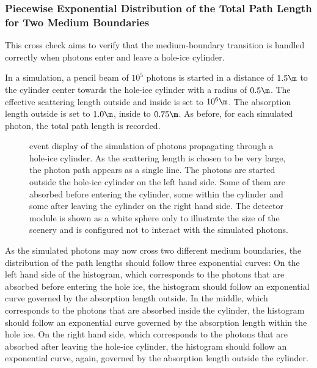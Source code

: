 
\FloatBarrier\newpage
\subsubsection{Piecewise Exponential Distribution of the Total Path Length for Two Medium Boundaries}


This cross check aims to verify that the medium-boundary transition is handled correctly when photons enter and leave a hole-ice cylinder.

In a simulation, a pencil beam of $10^5$ photons is started in a distance of $1.5\m$ to the cylinder center towards the hole-ice cylinder with a radius of $0.5\m$. The effective scattering length outside and inside is set to $10^6\m$. The absorption length outside is set to $1.0\m$, inside to $0.75\m$.
As before, for each simulated photon, the total path length is recorded.


\begin{figure}[htbp]
  \caption{\steamshovel event display of the simulation of photons propagating through a hole-ice cylinder. As the scattering length is chosen to be very large, the photon path appears as a single line.  The photons are started outside the hole-ice cylinder on the left hand side. Some of them are absorbed before entering the cylinder, some within the cylinder and some after leaving the cylinder on the right hand side. The detector module is shown as a white sphere only to illustrate the size of the scenery and is configured not to interact with the simulated photons.}
\end{figure}

As the simulated photons may now cross two different medium boundaries, the distribution of the path lengths should follow three exponential curves: On the left hand side of the histogram, which corresponds to the photons that are absorbed before entering the hole ice, the histogram should follow an exponential curve governed by the absorption length outside. In the middle, which corresponds to the photons that are absorbed inside the cylinder, the histogram should follow an exponential curve governed by the absorption length within the hole ice. On the right hand side, which corresponds to the photons that are absorbed after leaving the hole-ice cylinder, the histogram should follow an exponential curve, again, governed by the absorption length outside the cylinder.

